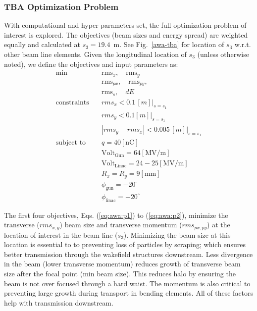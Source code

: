\subsubsection{TBA Optimization Problem}
With computational and hyper parameters set, 
the full optimization problem of interest is explored.
The objectives (beam sizes and energy spread) are weighted 
equally and calculated at 
$s_3=19.4$~m. See Fig.~\ref{awa-tba} for location of $s_3$ w.r.t. other 
beam line elements. 
Given the longitudinal location of $s_3$ (unless otherwise noted), 
we define the objectives and input parameters as:
\begin{align}
\text{min}  \quad & \text{rms}_{x}, \quad \text{rms}_{y} \label{eq:awa:p1}\\
& \text{rms}_{px}, \quad \text{rms}_{py}, \label{eq:awa:p2}\\
& \text{rms}_{s}, \quad dE \label{eq:awa:p4} \\
\text{constraints} \quad & rms_x < 0.1 \, [m] |_{s=s_1}\label{eq:awa:c1}\\
\quad & rms_y < 0.1 [m] |_{s=s_1}\, \label{eq:awa:c2}\\
\quad & |rms_y - rms_x | < 0.005 \, [m] |_{s=s_1}\label{eq:awa:c3}\\
\text{subject to} \quad & q = 40 \left[\text{nC}\right] \label{eq:awa:firstconstr}\\
\quad & \text{Volt}_{\text{Gun}} = 64\left[\text{MV/m}\right] \label{eq:awa:lastconstr}\\
\quad & \text{Volt}_{\text{Linac}} = 24-25\left[\text{MV/m}\right] \\
\quad & R_x = R_y = 9 \left[\text{mm}\right] \label{eq:awa:firstdvar}\\
\quad & \phi_{\text{gun}} =-20^\circ \label{eq:awa:gphidvar}\\
\quad & \phi_{\text{linac}} =-20^\circ \label{eq:awa:lastdvar}
\end{align}



The first four objectives, Eqs. (\ref{eq:awa:p1}) to (\ref{eq:awa:p2}),
minimize the transverse ($rms_{x,y}$) beam size and transverse momentum ($rms_{px,py}$)
at the location of interest in the beam line ($s_3$).
Minimizing the beam size at this location is essential to 
to preventing loss of particles by scraping; 
which ensures better transmission through the wakefield structures downstream. 
Less divergence in the beam (lower transverse momentum) 
reduces growth of transverse beam size after the focal point (min beam size).
This reduces halo by ensuring the beam is not over focused through a hard waist.
The momentum is also critical to preventing large growth during transport in bending elements. 
All of these factors help with transmission downstream. 

